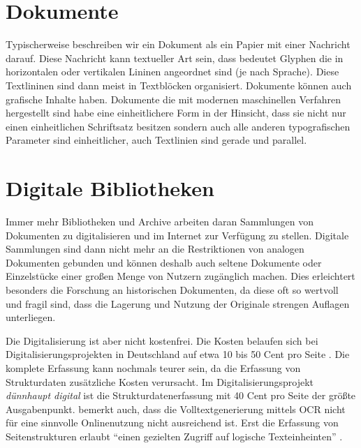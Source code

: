 \section{Dokumente}
Typischerweise beschreiben wir ein Dokument als ein Papier mit einer Nachricht darauf. 
Diese Nachricht kann textueller Art sein, dass bedeutet Glyphen die in horizontalen oder vertikalen Lininen angeordnet sind (je nach Sprache)\parencite{BairdBriefHistoryDocuments2014}.
Diese Textlininen sind dann meist in Textblöcken organisiert. 
Dokumente können auch grafische Inhalte haben. 
Dokumente die mit modernen maschinellen Verfahren hergestellt sind habe eine einheitlichere Form in der Hinsicht, dass sie nicht nur einen einheitlichen Schriftsatz besitzen sondern auch alle anderen typografischen Parameter sind einheitlicher, auch Textlinien sind gerade und parallel.  

\section{Digitale Bibliotheken}
Immer mehr Bibliotheken und Archive arbeiten daran Sammlungen von Dokumenten zu digitalisieren und im Internet zur Verfügung zu stellen. 
Digitale Sammlungen sind dann nicht mehr an die Restriktionen von analogen Dokumenten gebunden und können deshalb auch seltene Dokumente oder Einzelstücke einer großen Menge von Nutzern zugänglich machen.
Dies erleichtert besonders die Forschung an  historischen Dokumenten, da diese oft so wertvoll und fragil sind, dass die Lagerung und Nutzung der Originale strengen Auflagen unterliegen.

Die Digitalisierung ist aber nicht kostenfrei. 
Die Kosten belaufen sich bei Digitalisierungsprojekten in Deutschland auf etwa 10 bis 50 Cent pro Seite \parencite{OpitzWorkshopMassendigitalisierungsprojekteDeutschen2009}.
Die komplete Erfassung kann nochmals teurer sein, da die Erfassung von Strukturdaten zusätzliche Kosten verursacht. 
Im Digitalisierungsprojekt \emph{dünnhaupt digital} ist die Strukturdatenerfassung mit 40 Cent pro Seite der größte Ausgabenpunkt.
\cite{OpitzWorkshopMassendigitalisierungsprojekteDeutschen2009} bemerkt auch, dass die Volltextgenerierung mittels OCR nicht für eine sinnvolle Onlinenutzung nicht ausreichend ist.
 Erst die Erfassung von Seitenstrukturen erlaubt  ``einen gezielten Zugriff auf  logische Texteinheinten'' \parencite[372]{OpitzWorkshopMassendigitalisierungsprojekteDeutschen2009}.

